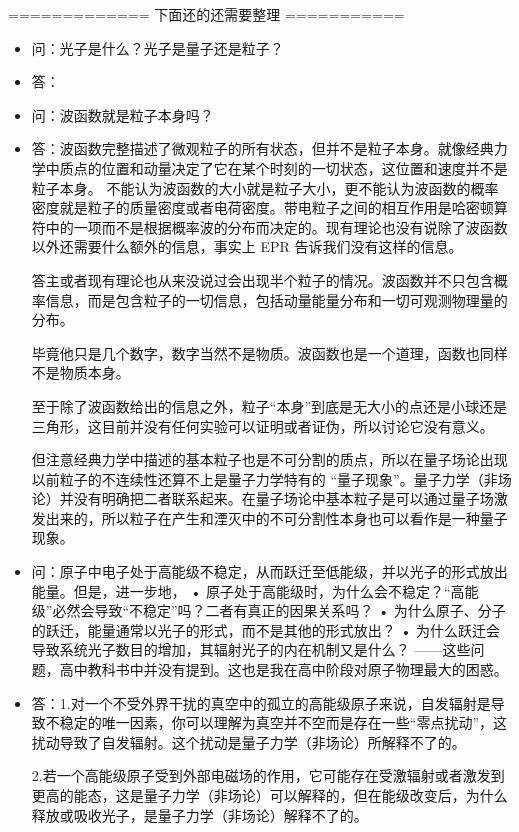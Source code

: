 ============= 下面还的还需要整理 ===========

\begin{itemize}
\item 问：光子是什么？光子是量子还是粒子？
\item 答：

\item 问：波函数就是粒子本身吗？
\item 答：波函数完整描述了微观粒子的所有状态，但并不是粒子本身。就像经典力学中质点的位置和动量决定了它在某个时刻的一切状态，这位置和速度并不是粒子本身。 不能认为波函数的大小就是粒子大小，更不能认为波函数的概率密度就是粒子的质量密度或者电荷密度。带电粒子之间的相互作用是哈密顿算符中的一项而不是根据概率波的分布而决定的。现有理论也没有说除了波函数以外还需要什么额外的信息，事实上 EPR 告诉我们没有这样的信息。

答主或者现有理论也从来没说过会出现半个粒子的情况。波函数并不只包含概率信息，而是包含粒子的一切信息，包括动量能量分布和一切可观测物理量的分布。

毕竟他只是几个数字，数字当然不是物质。波函数也是一个道理，函数也同样不是物质本身。

至于除了波函数给出的信息之外，粒子“本身”到底是无大小的点还是小球还是三角形，这目前并没有任何实验可以证明或者证伪，所以讨论它没有意义。

但注意经典力学中描述的基本粒子也是不可分割的质点，所以在量子场论出现以前粒子的不连续性还算不上是量子力学特有的 “量子现象”。量子力学（非场论）并没有明确把二者联系起来。在量子场论中基本粒子是可以通过量子场激发出来的，所以粒子在产生和湮灭中的不可分割性本身也可以看作是一种量子现象。

\item 问：原子中电子处于高能级不稳定，从而跃迁至低能级，并以光子的形式放出能量。但是，进一步地，
• 原子处于高能级时，为什么会不稳定？“高能级”必然会导致“不稳定”吗？二者有真正的因果关系吗？
• 为什么原子、分子的跃迁，能量通常以光子的形式，而不是其他的形式放出？
• 为什么跃迁会导致系统光子数目的增加，其辐射光子的内在机制又是什么？
——这些问题，高中教科书中并没有提到。这也是我在高中阶段对原子物理最大的困惑。
\item 答：1.对一个不受外界干扰的真空中的孤立的高能级原子来说，自发辐射是导致不稳定的唯一因素，你可以理解为真空并不空而是存在一些“零点扰动”，这扰动导致了自发辐射。这个扰动是量子力学（非场论）所解释不了的。

2.若一个高能级原子受到外部电磁场的作用，它可能存在受激辐射或者激发到更高的能态，这是量子力学（非场论）可以解释的，但在能级改变后，为什么释放或吸收光子，是量子力学（非场论）解释不了的。


\end{itemize}
